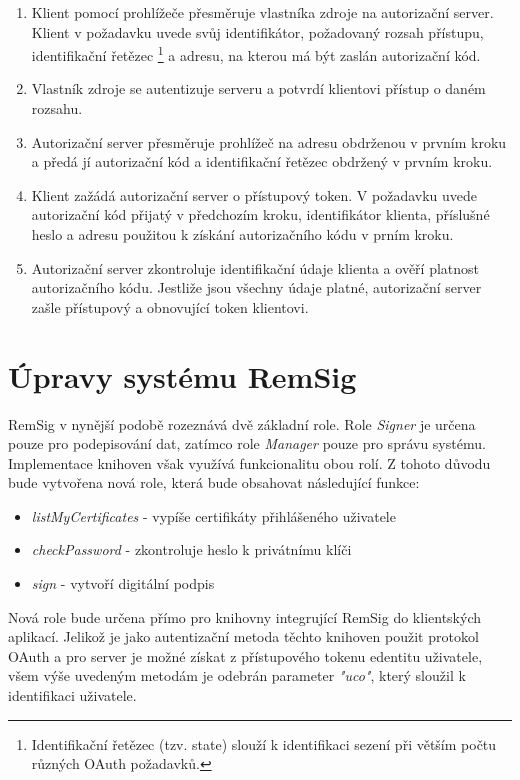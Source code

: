 \documentclass[]{fithesis3}
\begin{document}
	\begin{enumerate}
		\item {
		Klient pomocí prohlížeče přesměruje vlastníka zdroje na autorizační server. Klient v 				požadavku uvede svůj identifikátor, požadovaný rozsah přístupu,  identifikační řetězec
			\footnote {
			Identifikační řetězec (tzv. state) slouží k identifikaci sezení při větším počtu různých 				OAuth požadavků.
			}	 
		a adresu, na kterou má být zaslán autorizační kód.
		}
		\item
		Vlastník zdroje se autentizuje serveru a potvrdí klientovi přístup o daném rozsahu.
		\item
		Autorizační server přesměruje prohlížeč na adresu obdrženou v prvním kroku a předá jí 			autorizační kód a identifikační řetězec obdržený v prvním kroku.
		\item
		Klient zažádá autorizační server o přístupový token. V požadavku uvede autorizační kód 			přijatý v předchozím kroku, identifikátor klienta, příslušné heslo a adresu použitou k 				získání autorizačního kódu v prním kroku. 
		\item	
		Autorizační server zkontroluje identifikační údaje klienta a ověří platnost autorizačního 				kódu. Jestliže jsou všechny údaje platné, autorizační server zašle přístupový a obnovující 			token klientovi.

	\end{enumerate}

	\section{Úpravy systému RemSig}

	RemSig v nynější podobě rozeznává dvě základní role. Role \textit{Signer} je určena pouze pro 		podepisování dat, zatímco role \textit{Manager} pouze pro správu systému. Implementace 			knihoven však využívá funkcionalitu obou rolí. Z tohoto důvodu bude vytvořena nová role, 			která bude obsahovat následující funkce:
	\begin{itemize}
		\item \textit{listMyCertificates} - vypíše certifikáty přihlášeného uživatele

		\item \textit{checkPassword} - zkontroluje heslo k privátnímu klíči

		\item \textit{sign} - vytvoří digitální podpis
	\end{itemize}

	Nová role bude určena přímo pro knihovny integrující RemSig do klientských aplikací. Jelikož 		je jako autentizační metoda těchto knihoven použit protokol OAuth a pro server je možné 			získat z přístupového tokenu edentitu uživatele, všem výše uvedeným metodám je odebrán 		parameter \textit{"uco"}, který sloužil k identifikaci uživatele.
\end{document}
